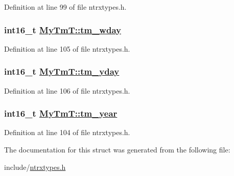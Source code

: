 Definition at line 99 of file ntrxtypes.h.\hypertarget{structMyTmT_22777f0b7044d8af1f4f5b93cc3faac6}{
\subsubsection[tm\_\-wday]{\setlength{\rightskip}{0pt plus 5cm}int16\_\-t \hyperlink{structMyTmT_22777f0b7044d8af1f4f5b93cc3faac6}{My\-Tm\-T::tm\_\-wday}}}
\label{structMyTmT_22777f0b7044d8af1f4f5b93cc3faac6}




Definition at line 105 of file ntrxtypes.h.\hypertarget{structMyTmT_dcf1c6eb3a918d22d866d960e2a813db}{
\subsubsection[tm\_\-yday]{\setlength{\rightskip}{0pt plus 5cm}int16\_\-t \hyperlink{structMyTmT_dcf1c6eb3a918d22d866d960e2a813db}{My\-Tm\-T::tm\_\-yday}}}
\label{structMyTmT_dcf1c6eb3a918d22d866d960e2a813db}




Definition at line 106 of file ntrxtypes.h.\hypertarget{structMyTmT_6e7bdc1bd327a2bb486c68d9088b2a5e}{
\subsubsection[tm\_\-year]{\setlength{\rightskip}{0pt plus 5cm}int16\_\-t \hyperlink{structMyTmT_6e7bdc1bd327a2bb486c68d9088b2a5e}{My\-Tm\-T::tm\_\-year}}}
\label{structMyTmT_6e7bdc1bd327a2bb486c68d9088b2a5e}




Definition at line 104 of file ntrxtypes.h.

The documentation for this struct was generated from the following file:\begin{CompactItemize}
\item 
include/\hyperlink{ntrxtypes_8h}{ntrxtypes.h}\end{CompactItemize}
